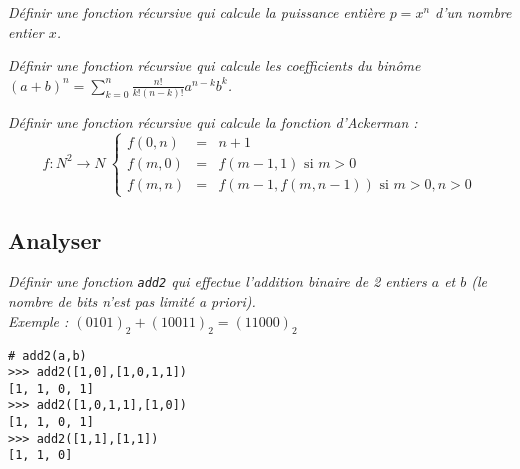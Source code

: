 \begin{td}\label{td:puissance}
\em
Définir une fonction récursive qui calcule la puissance entière $p = x^n$ 
d'un nombre entier $x$.
\end{td}

\begin{td}\label{td:binome}
\em
Définir une fonction récursive qui calcule les coefficients du binôme 
$\displaystyle (a+b)^n = \sum_{k=0}^n \frac{n!}{k!(n-k)!}a^{n-k}b^k$.
\end{td}

\begin{td}\label{td:ackerman}
\em
Définir une fonction récursive qui calcule la fonction d'Ackerman : 
$$
{f : N^2 \rightarrow N}\ 
\left\{\begin{array}{lll}
f{(0,n)} & = & n+1\\
f{(m,0)} & = & f{(m-1,1)}\mbox{\ si\ } m > 0\\
f{(m,n)} & = & f{(m-1,f{(m,n-1)})}\mbox{\ si\ } m > 0, n > 0
\end{array}\right.
$$
\end{td}

\subsection{Analyser}

\begin{td}[Addition binaire]\label{td:addition2}
\em
Définir une fonction {\tt add2} qui effectue l'addition binaire de 2 
entiers $a$ et $b$ (le nombre de bits n'est pas limité {\em a priori}).\\
Exemple : $(0101)_2 + (10011)_2 = (11000)_2$

\begin{py}{7cm}
\begin{verbatim}
# add2(a,b)
>>> add2([1,0],[1,0,1,1])
[1, 1, 0, 1]
>>> add2([1,0,1,1],[1,0])
[1, 1, 0, 1]
>>> add2([1,1],[1,1])
[1, 1, 0]
\end{verbatim}
\end{py}
\end{td}

